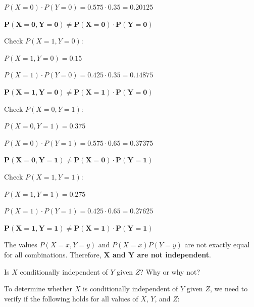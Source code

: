 \documentclass[12pt,letterpaper, onecolumn]{exam}
\begin{document}
\begin{questions}
\begin{parts}
\begin{subparts}
\begin{solution}
\begin{center}
                    $P(X=0) \cdot P(Y=0) = 0.575 \cdot 0.35 = 0.20125$

                    $\boldsymbol{P(X=0,Y=0) \neq P(X=0) \cdot P(Y=0)}$
                \end{center}

                Check $P(X=1,Y=0)$:

                \begin{center}
                    $P(X=1,Y=0) = 0.15$

                    $P(X=1) \cdot P(Y=0) = 0.425 \cdot 0.35 = 0.14875$

                    $\boldsymbol{P(X=1,Y=0) \neq P(X=1) \cdot P(Y=0)}$
                \end{center}

                Check $P(X=0,Y=1)$:

                \begin{center}
                    $P(X=0,Y=1) = 0.375$

                    $P(X=0) \cdot P(Y=1) = 0.575 \cdot 0.65 = 0.37375$

                    $\boldsymbol{P(X=0,Y=1) \neq P(X=0) \cdot P(Y=1)}$
                \end{center}

                Check $P(X=1,Y=1)$:

                \begin{center}
                    $P(X=1,Y=1) = 0.275$

                    $P(X=1) \cdot P(Y=1) = 0.425 \cdot 0.65 = 0.27625$

                    $\boldsymbol{P(X=1,Y=1) \neq P(X=1) \cdot P(Y=1)}$
                \end{center}

                The values $P(X=x,Y=y)$ and $P(X=x)P(Y=y)$ are not exactly equal for all combinations. 
                Therefore, \textbf{$\boldsymbol{X}$ and $\textbf{Y}$ are not independent}.
                
            \end{solution}

            \pagebreak

            \subpart[5]
            Is $X$ conditionally independent of $Y$ given $Z$? Why or why not?
    
            \begin{solution}

                To determine whether $X$ is conditionally independent of $Y$ given 
                $Z$, we need to verify if the following holds for all values of 
                $X$, $Y$, and $Z$:
                

\end{solution}
\end{subparts}
\end{parts}
\end{questions}
\end{document}
